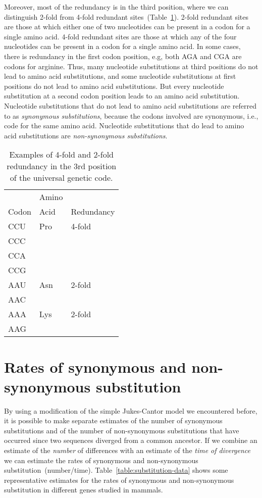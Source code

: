 \documentclass[12pt]{article}
\begin{document}
Moreover, most of the redundancy is in the third position, where we
can distinguish 2-fold from 4-fold redundant
sites~(Table~\ref{table:fold}). 2-fold redundant sites are those at
which either one of two nucleotides can be present in a codon for a
single amino acid. 4-fold redundant sites are those at which any of
the four nucleotides can be present in a codon for a single amino
acid. In some cases, there is redundancy in the first codon position,
e.g, both AGA and CGA are codons for arginine. Thus, many nucleotide
substitutions at third positions do not lead to amino acid
substitutions, and some nucleotide substitutions at first positions do
not lead to amino acid substitutions. But every nucleotide
substitution at a second codon position leads to an amino acid
substitution. Nucleotide substitutions that do not lead to amino acid
substitutions are referred to as {\it synonymous substitutions},
because the codons involved are synonymous, i.e., code for the same
amino acid. Nucleotide substitutions that do lead to amino acid
substitutions are {\it non-synonymous substitutions}.

\begin{table}
\begin{center}
\begin{tabular}{lll}
\hline\hline
      & Amino & \\
Codon & Acid  & Redundancy \\
\hline
CCU   & Pro   & 4-fold \\
CCC \\
CCA \\
CCG \\
\hline
AAU   & Asn   & 2-fold \\
AAC \\
AAA   & Lys   & 2-fold \\
AAG \\
\hline
\end{tabular}
\end{center}
\caption{Examples of 4-fold and 2-fold redundancy in the 3rd position
  of the universal genetic code.}\label{table:fold}
\end{table}

\section*{Rates of synonymous and non-synonymous substitution}

By using a modification of the simple Jukes-Cantor model we
encountered before, it is possible to make separate estimates of the
number of synonymous substitutions and of the number of non-synonymous
substitutions that have occurred since two sequences diverged from a
common ancestor. If we combine an estimate of the {\it number\/} of
differences with an estimate of the {\it time of divergence\/} we can
estimate the rates of synonymous and non-synonymous
substitution~(number/time). Table~\ref{table:substitution-data} shows
some representative estimates for the rates of synonymous and
non-synonymous substitution in different genes studied in
mammals.
\end{document}
